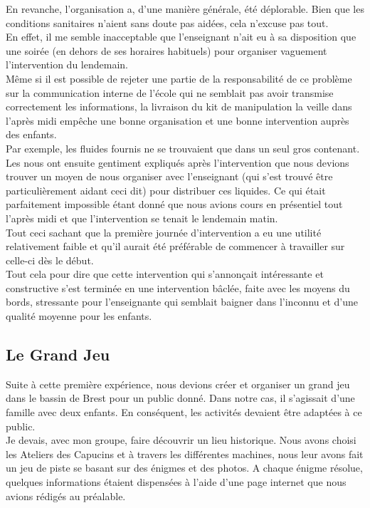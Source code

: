 En revanche, l'organisation a, d'une manière générale, été déplorable. Bien que les conditions sanitaires n'aient sans doute pas aidées, cela n'excuse pas tout.\\
En effet, il me semble inacceptable que l'enseignant n'ait eu à sa disposition que une soirée (en dehors de ses horaires habituels) pour organiser vaguement l'intervention du lendemain.\\
Même si il est possible de rejeter une partie de la responsabilité de ce problème sur la communication interne de l'école qui ne semblait pas avoir transmise correctement les informations, la livraison du kit de manipulation la veille dans l'après midi empêche une bonne organisation et une bonne intervention auprès des enfants.\\
Par exemple, les fluides fournis ne se trouvaient que dans un seul gros contenant.\\ Les \pd nous ont ensuite gentiment expliqués après l'intervention que nous devions trouver un moyen de nous organiser avec l'enseignant (qui s'est trouvé être particulièrement aidant ceci dit) pour distribuer ces liquides. Ce qui était parfaitement impossible étant donné que nous avions cours en présentiel tout l'après midi et que l'intervention se tenait le lendemain matin.\\
Tout ceci sachant que la première journée d'intervention a eu une utilité relativement faible et qu'il aurait été préférable de commencer à travailler sur celle-ci dès le début.\\

Tout cela pour dire que cette intervention qui s'annonçait intéressante et constructive s'est terminée en une intervention bâclée, faite avec les moyens du bords, stressante pour l'enseignante qui semblait baigner dans l'inconnu et d'une qualité moyenne pour les enfants.

\subsection{Le Grand Jeu}

Suite à cette première expérience, nous devions créer et organiser un grand jeu dans le bassin de Brest pour un public donné. Dans notre cas, il s'agissait d'une famille avec deux enfants. En conséquent, les activités devaient être adaptées à ce public.\\

Je devais, avec mon groupe, faire découvrir un lieu historique. Nous avons choisi les Ateliers des Capucins et à travers les différentes machines, nous leur avons fait un jeu de piste se basant sur des énigmes et des photos. A chaque énigme résolue, quelques informations étaient dispensées à l'aide d'une page internet que nous avions rédigés au préalable.\\

